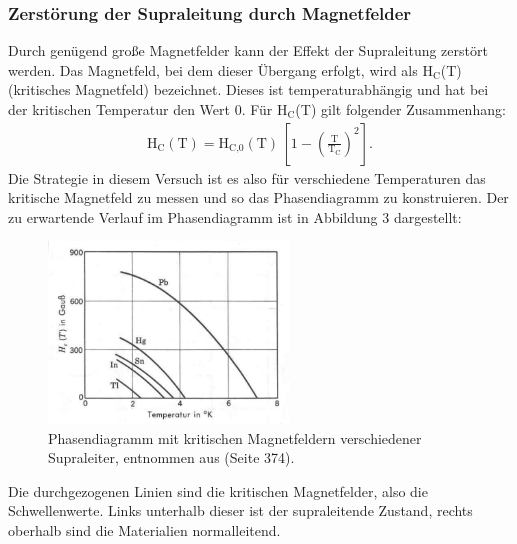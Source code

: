 \documentclass[german,  %
parskip=full,  %
]{scrartcl}
\begin{document}
\subsubsection{Zerstörung der Supraleitung durch Magnetfelder}
Durch genügend große Magnetfelder kann der Effekt der Supraleitung zerstört werden. Das Magnetfeld, bei dem dieser Übergang erfolgt, wird als H$_{\text{C}}$(T) (kritisches Magnetfeld) bezeichnet. Dieses ist temperaturabhängig und hat bei der kritischen Temperatur den Wert $0$. Für H$_{\text{C}}$(T) gilt folgender Zusammenhang:
\begin{align}
\label{h}
\text{H}_{\text{C}}(\text{T}) = \text{H}_{\text{C,0}}( \text{T}) \, \left[1-\left(\frac{\text{T}}{\text{T}_{\text {C}}}\right)^2 \right].
\end{align}
Die Strategie in diesem Versuch ist es also für verschiedene Temperaturen das kritische Magnetfeld zu messen und so das Phasendiagramm zu konstruieren. Der zu erwartende Verlauf im Phasendiagramm ist in Abbildung 3 dargestellt:
\begin{figure}[h!]
\centering
\includegraphics[width=0.57\textwidth]{pd_kittel}
\caption{Phasendiagramm mit kritischen Magnetfeldern verschiedener Supraleiter, entnommen aus \cite{5} (Seite 374).}
\end{figure}
\newpage
Die durchgezogenen Linien sind die kritischen Magnetfelder, also die Schwellenwerte. Links unterhalb dieser ist der supraleitende Zustand, rechts oberhalb sind die Materialien normalleitend.
\end{document}

